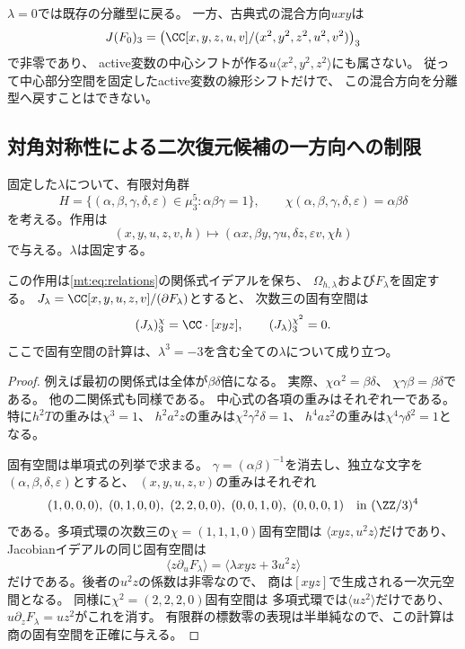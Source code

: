 $\lambda=0$では既存の分離型に戻る。
一方、古典式の混合方向$uxy$は
\[
 J(F_0)_3=\bigl(\CC[x,y,z,u,v]/(x^2,y^2,z^2,u^2,v^2)\bigr)_3
\]
で非零であり、
active変数の中心シフトが作る$u\langle x^2,y^2,z^2\rangle$にも属さない。
従って中心部分空間を固定したactive変数の線形シフトだけで、
この混合方向を分離型へ戻すことはできない。

\subsection{対角対称性による二次復元候補の一方向への制限}

固定した$\lambda$について、有限対角群
\[
 H=\{(\alpha,\beta,\gamma,\delta,\varepsilon)\in\mu_3^5:
       \alpha\beta\gamma=1\},\qquad
 \chi(\alpha,\beta,\gamma,\delta,\varepsilon)=\alpha\beta\delta
\]
を考える。作用は
\[
 (x,y,u,z,v,h)\longmapsto
 (\alpha x,\beta y,\gamma u,\delta z,\varepsilon v,\chi h)
\]
で与える。$\lambda$は固定する。

\begin{lemma}[量子族の同変性とJacobian固有空間]
\label{mt:lem:character-space}
この作用は\eqref{mt:eq:relations}の関係式イデアルを保ち、
$\Omega_{h,\lambda}$および$F_\lambda$を固定する。
$J_\lambda=\CC[x,y,u,z,v]/(\partial F_\lambda)$とすると、
次数三の固有空間は
\begin{equation}\label{mt:eq:character-spaces}
 (J_\lambda)_3^\chi=\CC\cdot[xyz],\qquad
 (J_\lambda)_3^{\chi^2}=0.
\end{equation}
ここで固有空間の計算は、$\lambda^3=-3$を含む全ての$\lambda$について成り立つ。
\end{lemma}
\begin{proof}
例えば最初の関係式は全体が$\beta\delta$倍になる。
実際、$\chi\alpha^2=\beta\delta$、
$\chi\gamma\beta=\beta\delta$である。
他の二関係式も同様である。
中心式の各項の重みはそれぞれ一である。
特に$h^2T$の重みは$\chi^3=1$、
$h^2a^2z$の重みは$\chi^2\gamma^2\delta=1$、
$h^4az^2$の重みは$\chi^4\gamma\delta^2=1$となる。

固有空間は単項式の列挙で求まる。
$\gamma=(\alpha\beta)^{-1}$を消去し、独立な文字を
$(\alpha,\beta,\delta,\varepsilon)$とすると、
$(x,y,u,z,v)$の重みはそれぞれ
\[
 (1,0,0,0),\ (0,1,0,0),\ (2,2,0,0),\
 (0,0,1,0),\ (0,0,0,1)
 \quad\text{in }(\ZZ/3)^4
\]
である。多項式環の次数三の$\chi=(1,1,1,0)$固有空間は
$\langle xyz,u^2z\rangle$だけであり、
Jacobianイデアルの同じ固有空間は
\[
 \langle z\partial_uF_\lambda\rangle
 =\langle\lambda xyz+3u^2z\rangle
\]
だけである。後者の$u^2z$の係数は非零なので、
商は$[xyz]$で生成される一次元空間となる。
同様に$\chi^2=(2,2,2,0)$固有空間は
多項式環では$\langle uz^2\rangle$だけであり、
$u\partial_zF_\lambda=uz^2$がこれを消す。
有限群の標数零の表現は半単純なので、この計算は商の固有空間を正確に与える。
\end{proof}

